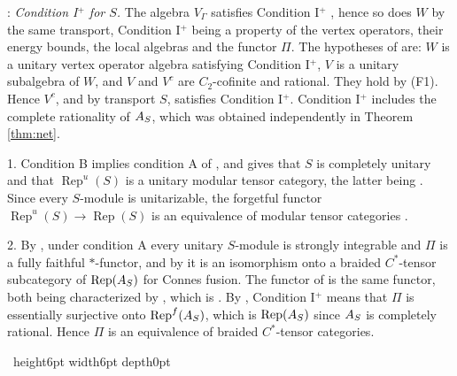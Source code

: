 \documentclass[leqno]{article}
\let\cal\relax
\newcommand{\cal}{\mathcal}
\newcommand{\qed}{\hfill \vrule height6pt  width6pt depth0pt}
\DeclareMathOperator{\Rep}{Rep}
\newenvironment{proof}[1][]{\noindent {\it Proof #1} : }{\hbox{~}\qed
\smallskip
}
\numberwithin{equation}{section}
\begin{document}
\begin{proof}
\emph{Condition I$^+$ for $S$.} The algebra $V_\Gamma$ satisfies Condition I$^+$ \cite[Example 6.19(b) p.~71]{Gui25}, hence so does $W$ by the same transport, Condition I$^+$ being a property of the vertex operators, their energy bounds, the local algebras and the functor $\Pi$. The hypotheses of \cite[Theorem 6.18(3) p.~70]{Gui25} are: $W$ is a unitary vertex operator algebra satisfying Condition I$^+$, $V$ is a unitary subalgebra of $W$, and $V$ and $V^c$ are $C_2$-cofinite and rational. They hold by (F1). Hence $V^c$, and by transport $S$, satisfies Condition I$^+$. Condition I$^+$ includes the complete rationality of $\cal A_S$, which was obtained independently in Theorem \ref{thm:net}.

1. Condition B implies condition A of \cite{Gui26}, and \cite[Theorem 3.15 p.~45]{Gui26} gives that $S$ is completely unitary and that $\Rep^u(S)$ is a unitary modular tensor category, the latter being \cite[Theorem 7.9 p.~53]{Gui19}. Since every $S$-module is unitarizable, the forgetful functor $\Rep^u(S) \to \Rep(S)$ is an equivalence of modular tensor categories \cite[Remark 4.3 p.~18]{CGGH23}.

2. By \cite[Theorems 3.16 and 3.17 p.~45]{Gui26}, under condition A every unitary $S$-module is strongly integrable and $\Pi$ is a fully faithful $*$-functor, and by \cite[Corollary 3.23 p.~48]{Gui26} it is an isomorphism onto a braided $C^*$-tensor subcategory of $\Rep(\cal A_S)$ for Connes fusion. The functor of \cite[Theorem 4.24 p.~43]{Gui25} is the same functor, both being characterized by \cite[(3.8) p.~41]{Gui26}, which is \cite[(4.6) p.~43]{Gui25}. By \cite[Theorem 6.14 pp.~68--69 and Definition 6.17 p.~70]{Gui25}, Condition I$^+$ means that $\Pi$ is essentially surjective onto $\Rep^f(\cal A_S)$, which is $\Rep(\cal A_S)$ since $\cal A_S$ is completely rational. Hence $\Pi$ is an equivalence of braided $C^*$-tensor categories.


\end{proof}
\end{document}
